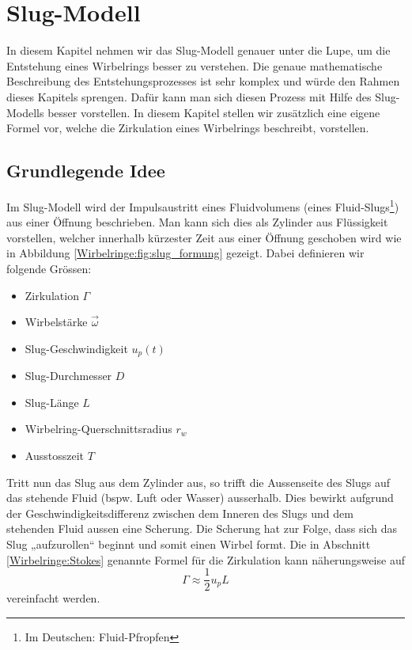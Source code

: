 %
%
%
\section{Slug-Modell}
In diesem Kapitel nehmen wir das Slug-Modell genauer unter die Lupe, um die Entstehung eines Wirbelrings besser zu verstehen.
Die genaue mathematische Beschreibung des Entstehungsprozesses ist sehr komplex und würde den Rahmen dieses Kapitels sprengen.
Dafür kann man sich diesen Prozess mit Hilfe des Slug-Modells besser vorstellen.
In diesem Kapitel stellen wir zusätzlich eine eigene Formel vor, welche die Zirkulation eines Wirbelrings beschreibt, vorstellen.

\subsection{Grundlegende Idee}
Im Slug-Modell wird der Impulsaustritt eines Fluidvolumens (eines Fluid-Slugs\footnote{Im Deutschen: Fluid-Pfropfen}) aus einer Öffnung beschrieben.
Man kann sich dies als Zylinder aus Flüssigkeit vorstellen, welcher innerhalb kürzester Zeit aus einer Öffnung geschoben wird wie in Abbildung \ref{Wirbelringe:fig:slug_formung} gezeigt.
Dabei definieren wir folgende Grössen:
\begin{itemize}
    \item Zirkulation \(\Gamma\)
    \item Wirbelstärke \(\vec{\omega}\)
    \item Slug-Geschwindigkeit \(u_p(t)\)
    \item Slug-Durchmesser \(D\)
    \item Slug-Länge \(L\)
    \item Wirbelring-Querschnittsradius \(r_w\)
    \item Ausstosszeit \(T\)
\end{itemize}



Tritt nun das Slug aus dem Zylinder aus, so trifft die Aussenseite des Slugs auf das stehende Fluid (bspw. Luft oder Wasser) ausserhalb.
Dies bewirkt aufgrund der Geschwindigkeitsdifferenz zwischen dem Inneren des Slugs und dem stehenden Fluid aussen eine Scherung.
Die Scherung hat zur Folge, dass sich das Slug „aufzurollen“ beginnt und somit einen Wirbel formt.
Die in Abschnitt \ref{Wirbelringe:Stokes} genannte Formel für die Zirkulation kann näherungsweise auf
\begin{equation*}
\Gamma 
\approx 
\frac{1}{2}u_pL
\end{equation*}
vereinfacht werden.

